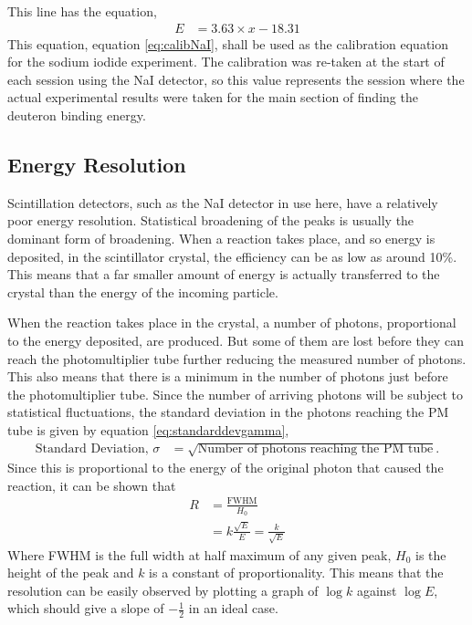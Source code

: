This line has the equation,
\begin{align}
	E &= 3.63\times x - 18.31 \label{eq:calibNaI}
\end{align}
This equation, equation \ref{eq:calibNaI}, shall be used as the calibration equation for the sodium iodide experiment. The calibration was re-taken at the start of each session using the NaI detector, so this value represents the session where the actual experimental results were taken for the main section of finding the deuteron binding energy.

\subsection{Energy Resolution} %
\label{sub:energy_resolution}
Scintillation detectors, such as the NaI detector in use here, have a relatively poor energy resolution. Statistical broadening of the peaks is usually the dominant form of broadening. When a reaction takes place, and so energy is deposited, in the scintillator crystal, the efficiency can be as low as around 10\%. This means that a far smaller amount of energy is actually transferred to the crystal than the energy of the incoming particle.

When the reaction takes place in the crystal, a number of photons, proportional to the energy deposited, are produced. But some of them are lost before they can reach the photomultiplier tube further reducing the measured number of photons. This also means that there is a minimum in the number of photons just before the photomultiplier tube. Since the number of arriving photons will be subject to statistical fluctuations, the standard deviation in the photons reaching the PM tube is given by equation \ref{eq:standarddevgamma}\cite{krane},
\begin{align}
	\text{Standard Deviation, }\sigma &= \sqrt{\text{Number of photons reaching the PM tube}}\label{eq:standarddevgamma}.
\end{align}
Since this is proportional to the energy of the original photon that caused the reaction, it can be shown that
\begin{align}
	R &= \frac{\text{FWHM}}{H_0} \\
	&= k\frac{\sqrt E}{E} = \frac{k}{\sqrt E}
\end{align}
Where FWHM is the full width at half maximum of any given peak, $H_0$ is the height of the peak and $k$ is a constant of proportionality. This means that the resolution can be easily observed by plotting a graph of $\log k$ against $\log E$, which should give a slope of $-\frac{1}{2}$ in an ideal case.

